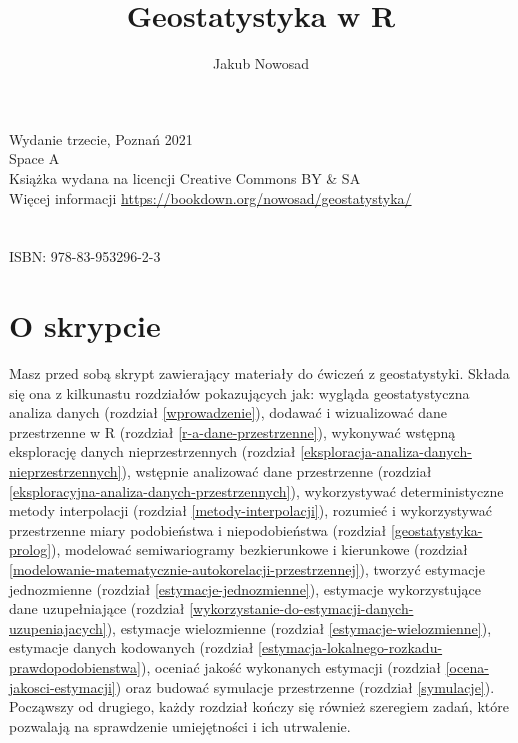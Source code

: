\documentclass[
  paper=6in:9in,pagesize=pdftex,headinclude=on,footinclude=on,10pt]{scrbook}
\title{Geostatystyka w R}
\author{Jakub Nowosad}
\date{}
\let\oldmaketitle\maketitle
\begin{document}
\maketitle

\thispagestyle{empty}


\let\maketitle\oldmaketitle
\maketitle

\thispagestyle{empty}
\vspace*{\fill}
Wydanie trzecie, Poznań 2021 \\
Space A \\
Książka wydana na licencji Creative Commons BY \& SA \\
Więcej informacji \url{https://bookdown.org/nowosad/geostatystyka/} \\
\\
\\
{\large ISBN: 978-83-953296-2-3}



\renewcommand*\contentsname{Spis treści}
{
\setcounter{tocdepth}{2}
\tableofcontents
}
\chapter*{O skrypcie}\label{o-skrypcie}


Masz przed sobą skrypt zawierający materiały do ćwiczeń z geostatystyki.
Składa się ona z kilkunastu rozdziałów pokazujących jak: wygląda geostatystyczna analiza danych (rozdział \ref{wprowadzenie}), dodawać i wizualizować dane przestrzenne w R (rozdział \ref{r-a-dane-przestrzenne}), wykonywać wstępną eksplorację danych nieprzestrzennych (rozdział \ref{eksploracja-analiza-danych-nieprzestrzennych}), wstępnie analizować dane przestrzenne (rozdział \ref{eksploracyjna-analiza-danych-przestrzennych}), wykorzystywać deterministyczne metody interpolacji (rozdział \ref{metody-interpolacji}), rozumieć i wykorzystywać przestrzenne miary podobieństwa i niepodobieństwa (rozdział \ref{geostatystyka-prolog}), modelować semiwariogramy bezkierunkowe i kierunkowe (rozdział \ref{modelowanie-matematycznie-autokorelacji-przestrzennej}), tworzyć estymacje jednozmienne (rozdział \ref{estymacje-jednozmienne}), estymacje wykorzystujące dane uzupełniające (rozdział \ref{wykorzystanie-do-estymacji-danych-uzupeniajacych}), estymacje wielozmienne (rozdział \ref{estymacje-wielozmienne}), estymacje danych kodowanych (rozdział \ref{estymacja-lokalnego-rozkadu-prawdopodobienstwa}), oceniać jakość wykonanych estymacji (rozdział \ref{ocena-jakosci-estymacji}) oraz budować symulacje przestrzenne (rozdział \ref{symulacje}).
Począwszy od drugiego, każdy rozdział kończy się również szeregiem zadań, które pozwalają na sprawdzenie umiejętności i ich utrwalenie.
\end{document}
